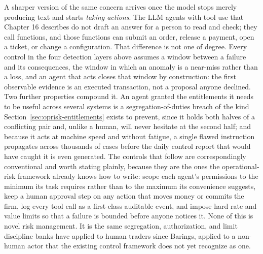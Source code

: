 \documentclass[../ai_in_finance]{subfiles}
\begin{document}
A sharper version of the same concern arrives once the model stops merely producing text and starts \emph{taking actions}. The LLM agents with tool use that Chapter 16 describes do not draft an answer for a person to read and check; they call functions, and those functions can submit an order, release a payment, open a ticket, or change a configuration. That difference is not one of degree. Every control in the four detection layers above assumes a window between a failure and its consequences, the window in which an anomaly is a near-miss rather than a loss, and an agent that acts closes that window by construction: the first observable evidence is an executed transaction, not a proposal anyone declined. Two further properties compound it. An agent granted the entitlements it needs to be useful across several systems is a segregation-of-duties breach of the kind Section~\ref{sec:oprisk-entitlements} exists to prevent, since it holds both halves of a conflicting pair and, unlike a human, will never hesitate at the second half; and because it acts at machine speed and without fatigue, a single flawed instruction propagates across thousands of cases before the daily control report that would have caught it is even generated. The controls that follow are correspondingly conventional and worth stating plainly, because they are the ones the operational-risk framework already knows how to write: scope each agent's permissions to the minimum its task requires rather than to the maximum its convenience suggests, keep a human approval step on any action that moves money or commits the firm, log every tool call as a first-class auditable event, and impose hard rate and value limits so that a failure is bounded before anyone notices it. None of this is novel risk management. It is the same segregation, authorization, and limit discipline banks have applied to human traders since Barings, applied to a non-human actor that the existing control framework does not yet recognize as one.
\end{document}
